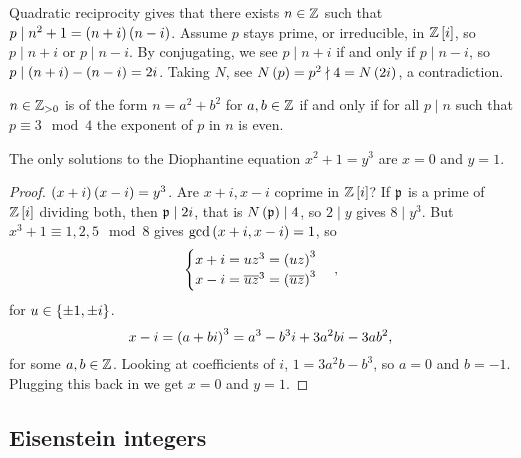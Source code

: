 
Quadratic reciprocity gives that there exists $ n \in \mathbb{Z} $ such that $ p \mid n^2 + 1 = \left( n + i \right)\left( n - i \right) $. Assume $ p $ stays prime, or irreducible, in $ \mathbb{Z}\left[ i \right] $, so $ p \mid n + i $ or $ p \mid n - i $. By conjugating, we see $ p \mid n + i $ if and only if $ p \mid n - i $, so $ p \mid \left( n + i \right) - \left( n - i \right) = 2i $. Taking $ N $, see $ N\left( p \right) = p^2 \nmid 4 = N\left( 2i \right) $, a contradiction.

\begin{theorem}
$ n \in \mathbb{Z}_{> 0} $ is of the form $ n = a^2 + b^2 $ for $ a, b \in \mathbb{Z} $ if and only if for all $ p \mid n $ such that $ p \equiv 3 \mod 4 $ the exponent of $ p $ in $ n $ is even.
\end{theorem}

\begin{theorem}
The only solutions to the Diophantine equation $ x^2 + 1 = y^3 $ are $ x = 0 $ and $ y = 1 $.
\end{theorem}

\begin{proof}
$ \left( x + i \right)\left( x - i \right) = y^3 $. Are $ x + i, x - i $ coprime in $ \mathbb{Z}\left[ i \right] $? If $ \mathfrak{p} $ is a prime of $ \mathbb{Z}\left[ i \right] $ dividing both, then $ \mathfrak{p} \mid 2i $, that is $ N\left( \mathfrak{p} \right) \mid 4 $, so $ 2 \mid y $ gives $ 8 \mid y^3 $. But $ x^3 + 1 \equiv 1, 2, 5 \mod 8 $ gives $ \gcd\left( x + i, x - i \right) = 1 $, so
$$
\begin{cases}
x + i = uz^3 = \left( uz \right)^3 \\
x - i = \overline{u}\overline{z}^3 = \left( \overline{u}\overline{z} \right)^3
\end{cases},
$$
for $ u \in \left\{ \pm 1, \pm i \right\} $.
$$ x - i = \left( a + bi \right)^3 = a^3 - b^3i + 3a^2bi - 3ab^2, $$
for some $ a, b \in \mathbb{Z} $. Looking at coefficients of $ i $, $ 1 = 3a^2b - b^3 $, so $ a = 0 $ and $ b = -1 $. Plugging this back in we get $ x = 0 $ and $ y = 1 $.
\end{proof}

\pagebreak

\subsection{Eisenstein integers}

